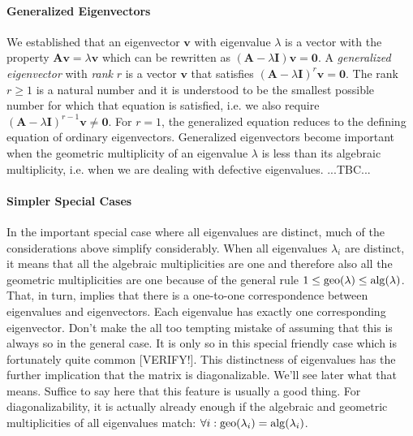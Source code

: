
\paragraph{Generalized Eigenvectors} We established that an eigenvector $\mathbf{v}$ with eigenvalue $\lambda$ is a vector with the property $\mathbf{A v} = \lambda \mathbf{v}$ which can be rewritten as $(\mathbf{A} - \lambda \mathbf{I}) \mathbf{v} = \mathbf{0}$. A \emph{generalized eigenvector} with \emph{rank} $r$ is a vector $\mathbf{v}$ that satisfies $(\mathbf{A} - \lambda \mathbf{I})^r \mathbf{v} = \mathbf{0}$. The rank $r \geq 1$ is a natural number and it is understood to be the smallest possible number for which that equation is satisfied, i.e. we also require  $(\mathbf{A} - \lambda \mathbf{I})^{r-1} \mathbf{v} \neq \mathbf{0}$. For $r = 1$, the generalized equation reduces to the defining equation of ordinary eigenvectors. Generalized eigenvectors become important when the geometric multiplicity of an eigenvalue $\lambda$ is less than its algebraic multiplicity, i.e. when we are dealing with defective eigenvalues.   ...TBC...




\paragraph{Simpler Special Cases} In the important special case where all eigenvalues are distinct, much of the considerations above simplify considerably. When all eigenvalues $\lambda_i$ are distinct, it means that all the algebraic multiplicities are one and therefore also all the geometric multiplicities are one because of the general rule $1 \leq \operatorname{geo}(\lambda) \leq \operatorname{alg}(\lambda)$. That, in turn, implies that there is a one-to-one correspondence between eigenvalues and eigenvectors. Each eigenvalue has exactly one corresponding eigenvector. Don't make the all too tempting mistake of assuming that this is always so in the general case. It is only so in this special friendly case which is fortunately quite common [VERIFY!]. This distinctness of eigenvalues has the further implication that the matrix is diagonalizable. We'll see later what that means. Suffice to say here that this feature is usually a good thing. For diagonalizability, it is actually already enough if the algebraic and geometric multiplicities of all eigenvalues match: $\forall i: \operatorname{geo}(\lambda_i) = \operatorname{alg}(\lambda_i)$. 

